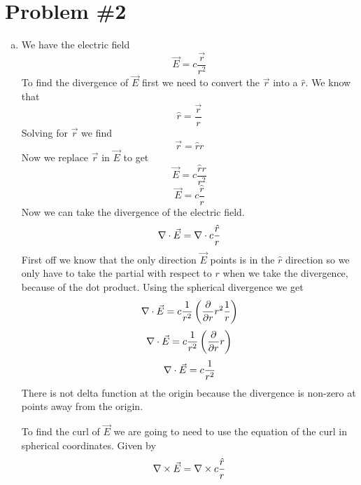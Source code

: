 \documentclass[11pt]{article}
\numberwithin{equation}{section}
\newcommand{\grad}{\bold\nabla}
\newcommand{\vecE}{\vec{E}}
\begin{document}
\section{Problem \#2}
\begin{enumerate}[(a)]
\item We have the electric field
$$\vecE = c\frac{\vec{r}}{r^2}$$ 
To find the divergence of $\vecE$ first we need to convert the $\vec{r}$ into a $\hat{r}$. We know that 
$$\hat{r} = \frac{\vec{r}}{r}$$
Solving for $\vec{r}$ we find
$$\vec{r} = \hat{r}r$$
Now we replace $\vec{r}$ in $\vecE$ to get
$$\vecE = c\frac{\hat{r}r}{r^2}$$ 
$$\vecE = c\frac{\hat{r}}{r}$$ 
Now we can take the divergence of the electric field. 
$$\grad\cdot\vecE = \grad \cdot c\frac{\hat{r}}{r}$$
First off we know that the only direction $\vecE$ points is in the $\hat{r}$ direction so we only have to take the partial with respect to $r$ when we take the divergence, because of the dot product. Using the spherical divergence we get
$$\grad\cdot\vecE = c\frac{1}{r^2}\left(\frac{\partial}{\partial r}r^2\frac{1}{r}\right)$$
$$\grad\cdot\vecE = c\frac{1}{r^2}\left(\frac{\partial}{\partial r}r\right)$$
\begin{equation}
\grad\cdot\vecE = c\frac{1}{r^2}
\label{divg}
\end{equation}
There is not delta function at the origin because the divergence is non-zero at points away from the origin. 

To find the curl of $\vecE$ we are going to need to use the equation of the curl in spherical coordinates. Given by
$$\grad\times\vecE = \grad\times c\frac{\hat{r}}{r}$$


\end{enumerate}
\end{document}
